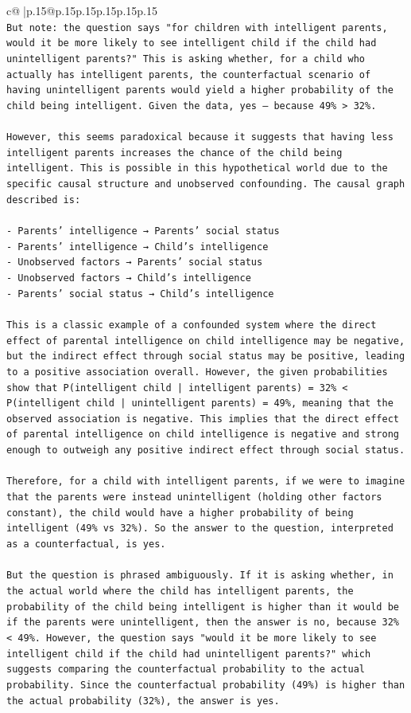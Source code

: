 \documentclass{article}
\begin{document}
{\begin{supertabular}{c@{$\;$}|p{.15\linewidth}@{}p{.15\linewidth}p{.15\linewidth}p{.15\linewidth}p{.15\linewidth}p{.15\linewidth}}
{{{\\ 
\texttt{But note: the question says "for children with intelligent parents, would it be more likely to see intelligent child if the child had unintelligent parents?" This is asking whether, for a child who actually has intelligent parents, the counterfactual scenario of having unintelligent parents would yield a higher probability of the child being intelligent. Given the data, yes — because 49\% > 32\%.} \\
\\ 
\texttt{However, this seems paradoxical because it suggests that having less intelligent parents increases the chance of the child being intelligent. This is possible in this hypothetical world due to the specific causal structure and unobserved confounding. The causal graph described is:} \\
\\ 
\texttt{{-} Parents' intelligence → Parents' social status} \\
\texttt{{-} Parents' intelligence → Child's intelligence} \\
\texttt{{-} Unobserved factors → Parents' social status} \\
\texttt{{-} Unobserved factors → Child's intelligence} \\
\texttt{{-} Parents' social status → Child's intelligence} \\
\\ 
\texttt{This is a classic example of a confounded system where the direct effect of parental intelligence on child intelligence may be negative, but the indirect effect through social status may be positive, leading to a positive association overall. However, the given probabilities show that P(intelligent child | intelligent parents) = 32\% < P(intelligent child | unintelligent parents) = 49\%, meaning that the observed association is negative. This implies that the direct effect of parental intelligence on child intelligence is negative and strong enough to outweigh any positive indirect effect through social status.} \\
\\ 
\texttt{Therefore, for a child with intelligent parents, if we were to imagine that the parents were instead unintelligent (holding other factors constant), the child would have a higher probability of being intelligent (49\% vs 32\%). So the answer to the question, interpreted as a counterfactual, is yes.} \\
\\ 
\texttt{But the question is phrased ambiguously. If it is asking whether, in the actual world where the child has intelligent parents, the probability of the child being intelligent is higher than it would be if the parents were unintelligent, then the answer is no, because 32\% < 49\%. However, the question says "would it be more likely to see intelligent child if the child had unintelligent parents?" which suggests comparing the counterfactual probability to the actual probability. Since the counterfactual probability (49\%) is higher than the actual probability (32\%), the answer is yes.} \\
}}}
\end{supertabular}}
\end{document}
